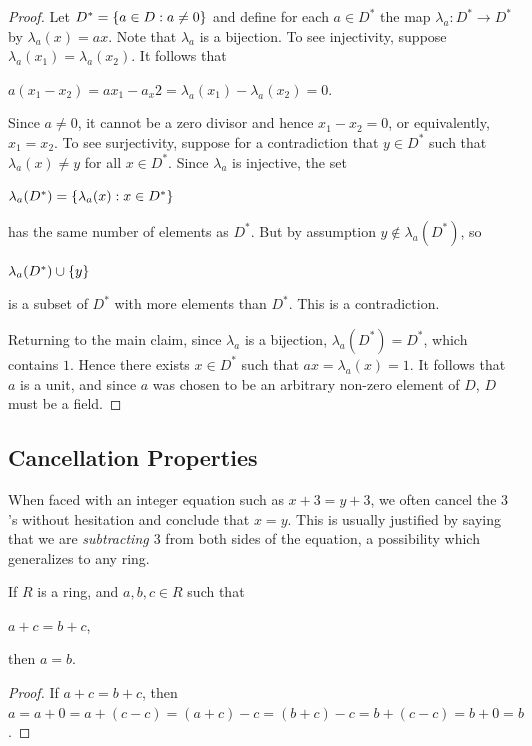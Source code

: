 \documentclass[11pt,fleqn,dvipsnames,usenames]{article}
\newcommand{\p}{\noindent}
\begin{document}
\begin{proof}
Let $D^{*} = \left\{a\in D:a\neq 0\right\}$ and define for each $a\in D^*$ the map $\lambda_{a}:D^{*}\to D^{*}$ by $\lambda_{a}(x) = ax$.  Note that $\lambda_{a}$ is a bijection.  To see injectivity, suppose $\lambda_{a}(x_{1}) = \lambda_{a}(x_{2})$.  It follows that
\begin{center}
$a(x_{1} - x_{2}) = ax_1 - a_x2 =  \lambda_{a}(x_{1}) - \lambda_{a}(x_{2}) = 0$.
\end{center}
Since $a\neq 0$, it cannot be a zero divisor and hence $x_{1} - x_{2} = 0$, or equivalently, $x_{1} = x_{2}$.  To see surjectivity, suppose for a contradiction that $y\in D^{*}$ such that $\lambda_{a}(x)\neq y$ for all $x\in D^{*}$.  Since $\lambda_{a}$ is injective, the set
\begin{center}
$\lambda_{a}(D^{*}) = \left\{\lambda_{a}(x):x\in D^{*}\right\}$
\end{center}
has the same number of elements as $D^{*}$.  But by assumption $y\notin \lambda_{a}(D^{*})$, so
\begin{center}
$\lambda_{a}(D^{*})\cup \left\{y\right\}$
\end{center}
is a subset of $D^{*}$ with more elements than $D^{*}$.  This is a contradiction.
\vsp

\p Returning to the main claim, since $\lambda_{a}$ is a bijection, $\lambda_{a}(D^{*}) = D^{*}$, which contains $1$.  Hence there exists $x\in D^{*}$ such that $ax = \lambda_{a}(x) = 1$.  It follows that $a$ is a unit, and since $a$ was chosen to be an arbitrary non-zero element of $D$, $D$ must be a field.  
\end{proof}
\vsp

\subsection{Cancellation Properties}

\p When faced with an integer equation such as $x + 3 = y + 3$, we often cancel the $3$'s without hesitation and conclude that $x = y$.  This is usually justified by saying that we are \emph{subtracting $3$} from both sides of the equation, a possibility which generalizes to any ring.

\begin{theorem}\label{additivecancellation}
If $R$ is a ring, and $a,b,c\in R$ such that
\begin{center}
$a + c = b + c$,
\end{center}
then $a = b$.
\end{theorem}
%
\begin{proof}
If $a + c = b + c$, then $a = a + 0 = a + (c - c) = (a + c) - c = (b + c) - c = b + (c - c) = b+0 = b$.
\end{proof}
\end{document}
